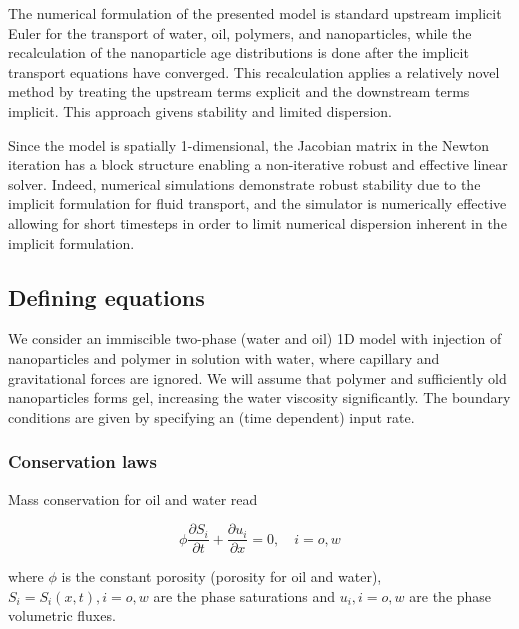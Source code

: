The numerical formulation of the presented model is standard upstream implicit Euler for the transport of water, oil, polymers, and nanoparticles, while the recalculation of the nanoparticle age distributions is done after the implicit transport equations have converged. This recalculation applies a relatively novel method \citep{Flatten2008} by treating the upstream terms explicit and the downstream terms implicit. This approach givens stability and limited dispersion. 

Since the model is spatially 1-dimensional, the Jacobian matrix in the Newton iteration has a block structure enabling a non-iterative robust and effective linear solver. Indeed, numerical simulations demonstrate robust stability due to the implicit formulation for fluid transport, and the simulator is numerically effective allowing for short timesteps in order to limit numerical dispersion inherent in the implicit formulation.

\subsection{Defining equations}
We consider an immiscible two-phase (water and oil) 1D model with injection of nanoparticles and polymer in solution with water, where capillary and gravitational forces are ignored. We will assume that polymer and sufficiently old nanoparticles forms gel, increasing the water viscosity significantly. The boundary conditions are given by specifying an (time dependent) input rate. 

\subsubsection{Conservation laws}
Mass conservation for oil and water read

\begin{equation}
    \phi\frac{\partial S_i}{\partial t}+\frac{\partial u_i}{\partial x} = 0,\quad i = o, w
\end{equation}

where $\phi$ is the constant porosity (porosity for oil and water), $S_i=S_i(x,t), i = o,w$ are the phase saturations and $u_i, i=o,w$ are the phase volumetric fluxes. 
